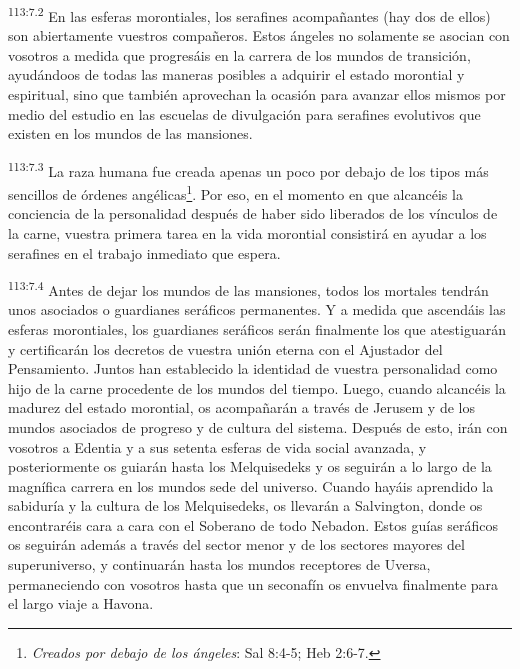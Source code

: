 \documentclass[twoside, 11pt]{book}
\begin{document}
\par
\textsuperscript{113:7.2} En las esferas morontiales, los serafines acompañantes (hay dos de ellos) son abiertamente vuestros compañeros. Estos ángeles no solamente se asocian con vosotros a medida que progresáis en la carrera de los mundos de transición, ayudándoos de todas las maneras posibles a adquirir el estado morontial y espiritual, sino que también aprovechan la ocasión para avanzar ellos mismos por medio del estudio en las escuelas de divulgación para serafines evolutivos que existen en los mundos de las mansiones.

\par
\textsuperscript{113:7.3} La raza humana fue creada apenas un poco por debajo de los tipos más sencillos de órdenes angélicas\footnote{\textit{Creados por debajo de los ángeles}: Sal 8:4-5; Heb 2:6-7.}. Por eso, en el momento en que alcancéis la conciencia de la personalidad después de haber sido liberados de los vínculos de la carne, vuestra primera tarea en la vida morontial consistirá en ayudar a los serafines en el trabajo inmediato que espera.

\par
\textsuperscript{113:7.4} Antes de dejar los mundos de las mansiones, todos los mortales tendrán unos asociados o guardianes seráficos permanentes. Y a medida que ascendáis las esferas morontiales, los guardianes seráficos serán finalmente los que atestiguarán y certificarán los decretos de vuestra unión eterna con el Ajustador del Pensamiento. Juntos han establecido la identidad de vuestra personalidad como hijo de la carne procedente de los mundos del tiempo. Luego, cuando alcancéis la madurez del estado morontial, os acompañarán a través de Jerusem y de los mundos asociados de progreso y de cultura del sistema. Después de esto, irán con vosotros a Edentia y a sus setenta esferas de vida social avanzada, y posteriormente os guiarán hasta los Melquisedeks y os seguirán a lo largo de la magnífica carrera en los mundos sede del universo. Cuando hayáis aprendido la sabiduría y la cultura de los Melquisedeks, os llevarán a Salvington, donde os encontraréis cara a cara con el Soberano de todo Nebadon. Estos guías seráficos os seguirán además a través del sector menor y de los sectores mayores del superuniverso, y continuarán hasta los mundos receptores de Uversa, permaneciendo con vosotros hasta que un seconafín os envuelva finalmente para el largo viaje a Havona.
\end{document}
